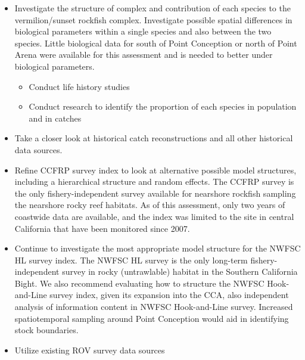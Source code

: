 \documentclass[11pt,
  english,
]{article}
\begin{document}
\begin{itemize}
\item
  Investigate the structure of complex and contribution of each species to the vermilion/sunset rockfish complex. Investigate possible spatial differences in biological parameters within a single species and also between the two species. Little biological data for south of Point Conception or north of Point Arena were available for this assessment and is needed to better under biological parameters.


  \begin{itemize}
  \item


    Conduct life history studies

    \tagmcend\tagstructend\tagstructend

    \tagmcend\tagstructend\tagstructend
  \item


    Conduct research to identify the proportion of each species in population and in catches

    \tagmcend\tagstructend\tagstructend

    \tagmcend\tagstructend\tagstructend
  \end{itemize}

  \tagstructend
\item
  Take a closer look at historical catch reconstructions and all other historical data sources.
\item
  Refine CCFRP survey index to look at alternative possible model structures, including a hierarchical structure and random effects. The CCFRP survey is the only fishery-independent survey available for nearshore rockfish sampling the nearshore rocky reef habitats. As of this assessment, only two years of coastwide data are available, and the index was limited to the site in central California that have been monitored since 2007.
\item
  Continue to investigate the most appropriate model structure for the NWFSC HL survey index. The NWFSC HL survey is the only long-term fishery-independent survey in rocky (untrawlable) habitat in the Southern California Bight. We also recommend evaluating how to structure the NWFSC Hook-and-Line survey index, given its expansion into the CCA, also independent analysis of information content in NWFSC Hook-and-Line survey. Increased spatiotemporal sampling around Point Conception would aid in identifying stock boundaries.
\item
  Utilize existing ROV survey data sources


\end{itemize}
\end{document}
